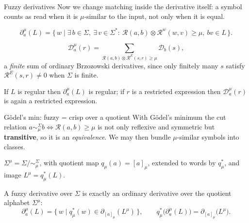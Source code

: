\documentclass[aspectratio=169]{beamer}
\newcommand{\cR}{\mathcal{R}}
\newcommand{\cut}{\mu}
\newcommand{\Dd}{\mathcal{D}}                 %
\begin{document}
\begin{frame}{Fuzzy derivatives}
  \small
  Now we change matching inside the derivative itself: a symbol counts as read
  when it is $\cut$-similar to the input, not only when it is equal.
  \begin{definition}
    \[
      \partial_a^\cut(L)=\{\,w\mid \exists\,b\in\Sigma,\ \exists\,v\in\Sigma^*:\
        \cR(a,b)\otimes\cR^w(w,v)\ge\cut,\ bv\in L\,\}.
    \]
  \end{definition}
  \begin{definition}
    \[
      \Dd_a^\cut(r)=\!\!\sum_{\cR(a,b)\otimes\cR^E(s,r)\ge\cut}\!\!\Dd_b(s),
    \]
    a \emph{finite} sum of ordinary Brzozowski derivatives, since only finitely
    many $s$ satisfy $\cR^E(s,r)\neq0$ when $\Sigma$ is finite.
  \end{definition}
  \begin{theorem}
    If $L$ is regular then $\partial_a^\cut(L)$ is regular; if $r$ is a
    restricted expression then $\Dd_a^\cut(r)$ is again a restricted expression.
  \end{theorem}
\end{frame}

\begin{frame}{G\"odel's min: fuzzy = crisp over a quotient}
  With G\"odel's minimum the cut relation
  $a\sim_\cut^\Sigma b \iff \cR(a,b)\ge\cut$ is not only reflexive and symmetric
  but \textbf{transitive}, so it is an \emph{equivalence}. We may then bundle
  $\cut$-similar symbols into classes.
  \begin{definition}
    $\Sigma^\cut=\Sigma/{\sim_\cut^\Sigma}$, with quotient map
    $q_\cut(a)=[a]_\cut$, extended to words by $q_\cut^*$, and image
    $L^\cut=q_\cut^*(L)$.
  \end{definition}
  \begin{theorem}
    A fuzzy derivative over $\Sigma$ is exactly an ordinary derivative over the
    quotient alphabet $\Sigma^\cut$:
    \[
      \partial_a^\cut(L)=\{\,w\mid q_\cut^*(w)\in\partial_{[a]_\cut}(L^\cut)\,\},
      \qquad
      q_\cut^*\big(\partial_a^\cut(L)\big)=\partial_{[a]_\cut}\big(L^\cut\big).
    \]
  \end{theorem}
\end{frame}
\end{document}
